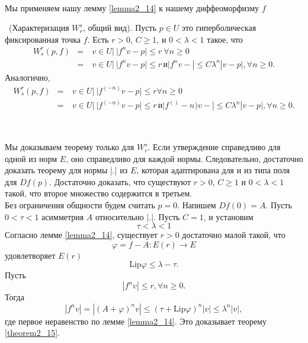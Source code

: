 \\ 
Мы применяем нашу лемму \ref{lemma2_14} к нашему диффеоморфизму $f$
\begin{theorem}
\label{theorem2_15} \ (Характеризация $W_r^s$, общий вид). Пусть $p \in U$ это гиперболическая фиксированная точка $f$. Есть $r > 0$, $C \geq 1$, и $0 < \lambda < 1$ такое, что
$$
\begin{array}{rclll}
W_s^r(p,f) & = & \ {v \in U | \ |f^n v - p| \leq r \ \forall n \geq 0 } \\
                   & = & \ {v \in U | \ |f^n v - p| \leq r \, и |f^n v - | \leq C \lambda^n|v - p|, \forall n \geq 0}.
\end{array} 
$$
Аналогично,
$$
\begin{array}{rclll}
W_s^r(p,f)         & = & \ {v \in U | \ |f^(-n) v - p| \leq r  \forall n \geq 0} \\
                   & = & \ {v \in U | \ |f^(-n) v - p| \leq r \, и |f^()-n) v - | \leq C \lambda^n|v - p|, \forall n \geq 0}.
\end{array} 
$$
\end{theorem}
\\
\begin{demo} 
Мы доказываем теорему только для $W_r^s$. Если утверждение справедливо для одной из норм $E$, оно справедливо для каждой нормы. Следовательно, достаточно доказать теорему для нормы |.| из $E$, которая адаптирована для и из типа поля для $Df(p)$. Достаточно доказать, что существуют $r > 0$, $C \geq 1$ и $ 0 < \lambda < 1$ такой, что второе множество содержится в третьем.
\\ Без ограничения общности будем считать $p = 0$. Напишем $Df(0) = A$. Пусть $0 < \tau < 1$ асимметрия $A$ относительно |.|. Пусть $C = 1$, и установим
$$
\tau < \lambda < 1
$$
Согласно лемме \ref{lemma2_14}, существует $r >0$ достаточно малой такой, что 
$$
\varphi = f - A : E(r) \to E
$$
удовлетворяет $E(r)$
$$
 \mathrm{Lip} \varphi \leq \lambda - \tau.
$$
Пусть
$$
|f^n v| \leq r, \forall n \geq 0.
$$
Тогда
$$
|f^n v| = |(A + \varphi)^n v| \leq (\tau +  \mathrm{Lip} \varphi)^n |v| \leq \lambda^n |v|,
$$
где первое неравенство по лемме \ref{lemma2_14}. Это доказывает теорему \ref{theorem2_15}.
\end{demo}

